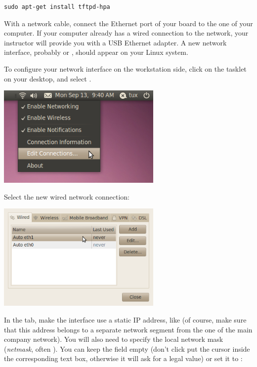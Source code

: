 \begin{verbatim}
sudo apt-get install tftpd-hpa
\end{verbatim}

With a network cable, connect the Ethernet port of your board to the
one of your computer. If your computer already has a wired connection
to the network, your instructor will provide you with a USB Ethernet
adapter. A new network interface, probably  or ,
should appear on your Linux system.

To configure your network interface on the workstation side, click on
the  tasklet on your desktop, and select
.

\begin{center}
\includegraphics[width=8cm]{labs/kernel-board-setup/network-config-1.png}
\end{center}

Select the new wired network connection:

\begin{center}
\includegraphics[width=8cm]{labs/kernel-board-setup/network-config-2.png}
\end{center}

In the  tab, make the interface use a static IP
address, like  (of course, make sure that this address
belongs to a separate network segment from the one of the main company
network). You will also need to specify the local network mask
(\emph{netmask}, often ). You can keep the
 field empty (don't click put the cursor inside the
corresponding text box, otherwise it will ask for a legal value)
or set it to :

